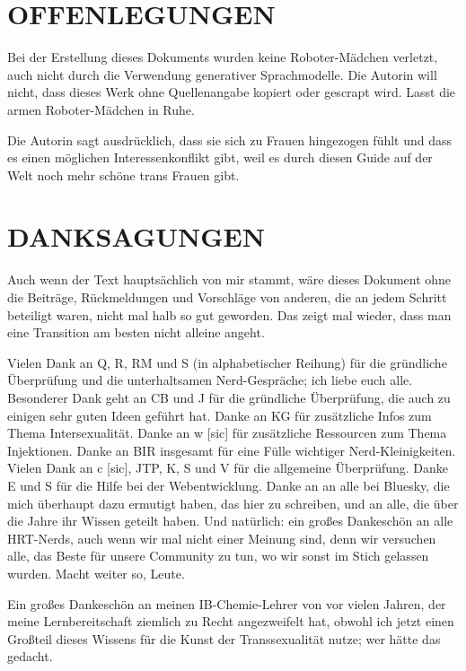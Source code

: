 \documentclass{article}
\begin{document}
\section*{OFFENLEGUNGEN}

Bei der Erstellung dieses Dokuments wurden keine Roboter-Mädchen verletzt, auch nicht durch die Verwendung generativer Sprachmodelle. Die Autorin will nicht, dass dieses Werk ohne Quellenangabe kopiert oder gescrapt wird. Lasst die armen Roboter-Mädchen in Ruhe.

Die Autorin sagt ausdrücklich, dass sie sich zu Frauen hingezogen fühlt und dass es einen möglichen Interessenkonflikt gibt, weil es durch diesen Guide auf der Welt noch mehr schöne trans Frauen gibt.



\section*{DANKSAGUNGEN}

Auch wenn der Text hauptsächlich von mir stammt, wäre dieses Dokument ohne die Beiträge, Rückmeldungen und Vorschläge von anderen, die an jedem Schritt beteiligt waren, nicht mal halb so gut geworden. Das zeigt mal wieder, dass man eine Transition  am besten nicht alleine angeht.

Vielen Dank an Q, R, RM und S (in alphabetischer Reihung) für die gründliche Überprüfung und die unterhaltsamen Nerd-Gespräche; ich liebe euch alle. Besonderer Dank geht an CB und J für die gründliche Überprüfung, die auch zu einigen sehr guten Ideen geführt hat. Danke an KG für zusätzliche Infos zum Thema Intersexualität. Danke an w [sic] für zusätzliche Ressourcen zum Thema Injektionen. Danke an BIR insgesamt für eine Fülle wichtiger Nerd-Kleinigkeiten. Vielen Dank an c [sic], JTP, K, S und V für die allgemeine Überprüfung. Danke E und S für die Hilfe bei der Webentwicklung. Danke an an alle bei Bluesky, die mich überhaupt dazu ermutigt haben, das hier zu schreiben, und an alle, die über die Jahre ihr Wissen geteilt haben. Und natürlich: ein großes Dankeschön an alle HRT-Nerds, auch wenn wir mal nicht einer Meinung sind, denn wir versuchen alle, das Beste für unsere Community zu tun, wo wir sonst im Stich gelassen wurden. Macht weiter so, Leute.

Ein großes Dankeschön an meinen IB-Chemie-Lehrer von vor vielen Jahren, der meine Lernbereitschaft ziemlich zu Recht angezweifelt hat, obwohl ich jetzt einen Großteil dieses Wissens für die Kunst der Transsexualität nutze; wer hätte das gedacht.
\end{document}
